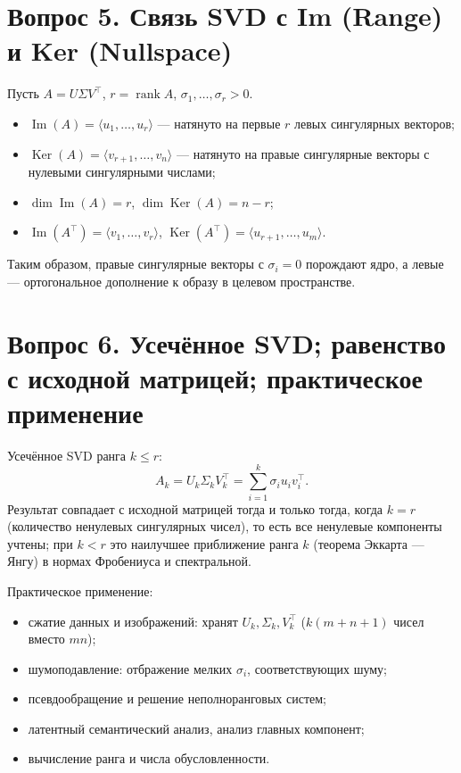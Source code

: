 \documentclass[12pt,a4paper]{article}
\DeclareMathOperator{\rank}{rank}
\begin{document}
\section{Вопрос 5. Связь SVD с Im (Range) и Ker (Nullspace)}
Пусть $A=U\Sigma V^\top$, $r=\rank A$, $\sigma_1,\dots,\sigma_r>0$.
\begin{itemize}
    \item $\operatorname{Im}(A) = \langle u_1,\dots,u_r\rangle$ — натянуто
    на первые $r$ левых сингулярных векторов;
    \item $\operatorname{Ker}(A) = \langle v_{r+1},\dots,v_n\rangle$ — натянуто
    на правые сингулярные векторы с нулевыми сингулярными числами;
    \item $\dim\operatorname{Im}(A)=r$, $\dim\operatorname{Ker}(A)=n-r$;
    \item $\operatorname{Im}(A^\top)=\langle v_1,\dots,v_r\rangle$,
    $\operatorname{Ker}(A^\top)=\langle u_{r+1},\dots,u_m\rangle$.
\end{itemize}
Таким образом, правые сингулярные векторы с $\sigma_i=0$ порождают ядро,
а левые — ортогональное дополнение к образу в целевом пространстве.

\section{Вопрос 6. Усечённое SVD; равенство с исходной матрицей; практическое применение}
Усечённое SVD ранга $k\le r$:
\[
    A_k = U_k\Sigma_k V_k^\top = \sum_{i=1}^{k}\sigma_i u_i v_i^\top.
\]
Результат совпадает с исходной матрицей тогда и только тогда, когда $k=r$
(количество ненулевых сингулярных чисел), то есть все ненулевые компоненты
учтены; при $k<r$ это наилучшее приближение ранга $k$ (теорема Эккарта —
Янгу) в нормах Фробениуса и спектральной.

Практическое применение:
\begin{itemize}
    \item сжатие данных и изображений: хранят $U_k,\Sigma_k,V_k^\top$
    ($k(m+n+1)$ чисел вместо $mn$);
    \item шумоподавление: отбражение мелких $\sigma_i$, соответствующих шуму;
    \item псевдообращение и решение неполноранговых систем;
    \item латентный семантический анализ, анализ главных компонент;
    \item вычисление ранга и числа обусловленности.
\end{itemize}
\end{document}
